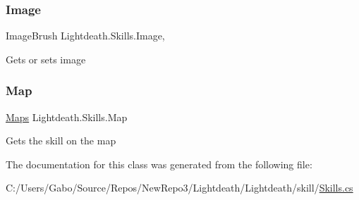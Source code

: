 \subsubsection{\texorpdfstring{Image}{Image}}
{\footnotesize\ttfamily Image\+Brush Lightdeath.\+Skills.\+Image\hspace{0.3cm}{\ttfamily [get]}, {\ttfamily [set]}}



Gets or sets image 

\hypertarget{class_lightdeath_1_1_skills_aeaeff627c47ffcd9c7079337536005b3}{}\label{class_lightdeath_1_1_skills_aeaeff627c47ffcd9c7079337536005b3} 
\subsubsection{\texorpdfstring{Map}{Map}}
{\footnotesize\ttfamily \hyperlink{class_lightdeath_1_1_maps}{Maps} Lightdeath.\+Skills.\+Map\hspace{0.3cm}{\ttfamily [get]}}



Gets the skill on the map 



The documentation for this class was generated from the following file\+:\begin{DoxyCompactItemize}
\item 
C\+:/\+Users/\+Gabo/\+Source/\+Repos/\+New\+Repo3/\+Lightdeath/\+Lightdeath/skill/\hyperlink{_skills_8cs}{Skills.\+cs}\end{DoxyCompactItemize}
